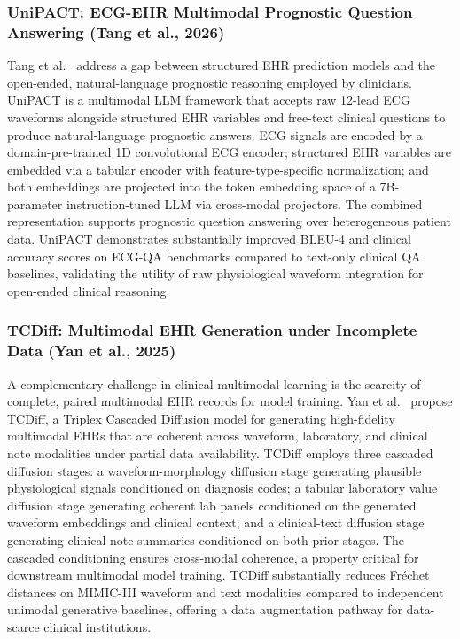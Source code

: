 \subsubsection{UniPACT: ECG-EHR Multimodal Prognostic Question Answering (Tang et al., 2026)}
Tang et al.~\cite{Tang2026UniPACT} address a gap between structured EHR prediction models and the open-ended, natural-language prognostic reasoning employed by clinicians. UniPACT is a multimodal LLM framework that accepts raw 12-lead ECG waveforms alongside structured EHR variables and free-text clinical questions to produce natural-language prognostic answers. ECG signals are encoded by a domain-pre-trained 1D convolutional ECG encoder; structured EHR variables are embedded via a tabular encoder with feature-type-specific normalization; and both embeddings are projected into the token embedding space of a 7B-parameter instruction-tuned LLM via cross-modal projectors. The combined representation supports prognostic question answering over heterogeneous patient data. UniPACT demonstrates substantially improved BLEU-4 and clinical accuracy scores on ECG-QA benchmarks compared to text-only clinical QA baselines, validating the utility of raw physiological waveform integration for open-ended clinical reasoning.

\subsubsection{TCDiff: Multimodal EHR Generation under Incomplete Data (Yan et al., 2025)}
A complementary challenge in clinical multimodal learning is the scarcity of complete, paired multimodal EHR records for model training. Yan et al.~\cite{Yan2025TCDiff} propose TCDiff, a Triplex Cascaded Diffusion model for generating high-fidelity multimodal EHRs that are coherent across waveform, laboratory, and clinical note modalities under partial data availability. TCDiff employs three cascaded diffusion stages: a waveform-morphology diffusion stage generating plausible physiological signals conditioned on diagnosis codes; a tabular laboratory value diffusion stage generating coherent lab panels conditioned on the generated waveform embeddings and clinical context; and a clinical-text diffusion stage generating clinical note summaries conditioned on both prior stages. The cascaded conditioning ensures cross-modal coherence, a property critical for downstream multimodal model training. TCDiff substantially reduces Fr\'echet distances on MIMIC-III waveform and text modalities compared to independent unimodal generative baselines, offering a data augmentation pathway for data-scarce clinical institutions.

